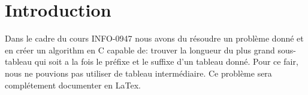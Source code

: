 \section{Introduction}\label{introduction}

Dans le cadre du cours INFO-0947
nous avons du résoudre un problème donné et en créer un algorithm en C capable de:
trouver la longueur du plus grand sous-tableau qui soit a la fois le préfixe et le suffixe d'un tableau donné.
Pour ce fair, nous ne pouvions pas utiliser de tableau intermédiaire.
Ce problème sera complétement documenter en LaTex.
